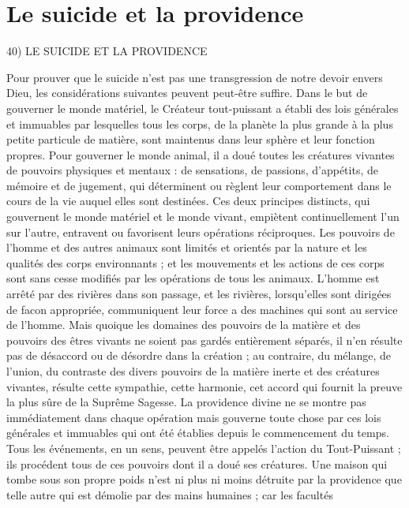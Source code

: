 
\section{Le suicide et la providence}
40) LE SUICIDE ET LA PROVIDENCE

Pour prouver que le suicide n’est pas une transgression
de notre devoir envers Dieu, les considérations suivantes
peuvent peut-être suffire. Dans le but de gouverner le
monde matériel, le Créateur tout-puissant a établi des
lois générales et immuables par lesquelles tous les corps,
de la planète la plus grande à la plus petite particule de
matière, sont maintenus dans leur sphère et leur fonction
propres. Pour gouverner le monde animal, il a doué toutes
les créatures vivantes de pouvoirs physiques et mentaux :
de sensations, de passions, d’appétits, de mémoire et de
jugement, qui déterminent ou règlent leur comportement
dans le cours de la vie auquel elles sont destinées. Ces
deux principes distincts, qui gouvernent le monde matériel
et le monde vivant, empiètent continuellement l'un sur
l'autre, entravent ou favorisent leurs opérations réciproques. 
Les pouvoirs de l'homme et des autres animaux
sont limités et orientés par la nature et les qualités des
corps environnants ; et les mouvements et les actions de
ces corps sont sans cesse modifiés par les opérations de
tous les animaux. L’homme est arrêté par des rivières
dans son passage, et les rivières, lorsqu’elles sont dirigées
de facon appropriée, communiquent leur force a des
machines qui sont au service de l'homme. Mais quoique
les domaines des pouvoirs de la matière et des pouvoirs des
êtres vivants ne soient pas gardés entièrement séparés,
il n’en résulte pas de désaccord ou de désordre dans la
création ; au contraire, du mélange, de l'union, du contraste
des divers pouvoirs de la matière inerte et des créatures
vivantes, résulte cette sympathie, cette harmonie, cet
accord qui fournit la preuve la plus sûre de la Suprême
Sagesse. La providence divine ne se montre pas immédiatement
dans chaque opération mais gouverne toute chose
par ces lois générales et immuables qui ont été établies
depuis le commencement du temps. Tous les événements,
en un sens, peuvent être appelés l’action du Tout-Puissant ;
ils procédent tous de ces pouvoirs dont il a doué ses créatures. 
Une maison qui tombe sous son propre poids n’est
ni plus ni moins détruite par la providence que telle autre
qui est démolie par des mains humaines ; car les facultés
